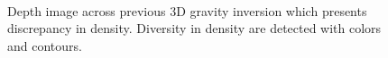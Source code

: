 \begin{figure}
	     \begin{center}
	        \\ %
	    \end{center}
	   \label{fig:subfigures}

\caption{Depth image across previous 3D gravity inversion which presents discrepancy in density. Diversity in density are detected with colors and contours.}
\end{figure}

